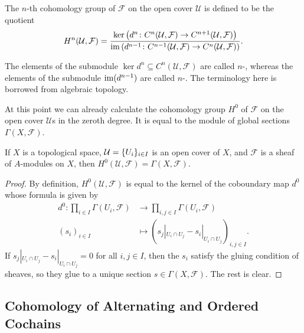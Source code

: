 \begin{definition}
	The $n$-th cohomology group of $\mathcal{F}$ on the open cover $\mathcal{U}$ is defined to be the quotient 
	\begin{equation*}
		{H}^n(\mathcal{U}, \mathcal{F}) = \frac{\ker \left(d^n \colon C^{n}(\mathcal{U}, \mathcal{F}) \to C^{n + 1}(\mathcal{U}, \mathcal{F})\right)}{\operatorname{im} \left(d^{n - 1} \colon C^{n - 1}(\mathcal{U}, \mathcal{F}) \to C^{n }(\mathcal{U}, \mathcal{F}) \right)}.
	\end{equation*}
\end{definition}

The elements of the submodule $\ker d^n \subseteq C^n(\mathcal{U}, \mathcal{F})$ are called $n$-, whereas the elements of the submodule $\operatorname{im}(d^{n - 1})$ are called $n$-. The terminology here is borrowed from algebraic topology.

At this point we can already calculate the cohomology group $H^0$ of $\mathcal{F}$ on the open cover $\mathcal{U}$s in the zeroth degree. It is equal to the module of global sections $\Gamma(X, \mathcal{F})$.
\begin{proposition}\label{chap15:zero-cohomology-group-is-global-section}
	If $X$ is a topological space, $\mathcal{U} = \lbrace U_i\rbrace_{i \in I}$ is an open cover of $X$, and $\mathcal{F}$ is a sheaf of $A$-modules on $X$, then $H^0(\mathcal{U}, \mathcal{F}) = \Gamma(X, \mathcal{F})$.
\end{proposition}
\begin{proof}
	By definition, $H^0(\mathcal{U}, \mathcal{F})$ is equal to the kernel of the coboundary map $d^0$ whose formula is given by
	\begin{align*}
		d^0 \colon \prod_{i \in I} \Gamma(U_i, \mathcal{F}) & \to \prod_{i, j \in I} \Gamma(U_i, \mathcal{F}) \\
		(s_i)_{i \in I} & \mapsto \left(s_j|_{U_i \cap U_j} - s_i|_{U_i \cap U_j} \right)_{i,j \in I}.
	\end{align*}
	If $s_j|_{U_i \cap U_j} - s_i|_{U_i \cap U_j} = 0$ for all $i, j \in I$, then the $s_i$ satisfy the gluing condition of sheaves, so they glue to a unique section $s \in \Gamma(X, \mathcal{F})$. The rest is clear.
\end{proof}

\subsection*{Cohomology of Alternating and Ordered Cochains}

